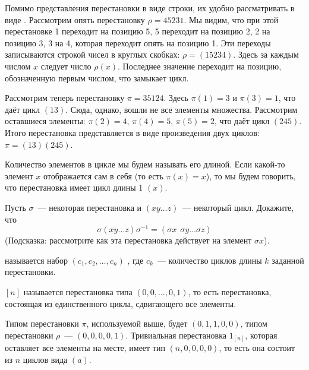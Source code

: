 Помимо представления перестановки в виде строки, их удобно рассматривать в виде . Рассмотрим опять перестановку $\rho = 45231$. Мы видим, что при этой перестановке 1 переходит на позицию 5, 5 переходит на позицию 2, 2 на позицию 3, 3 на 4, которая переходит опять на позицию 1. Эти переходы записываются строкой чисел в круглых скобках: $\rho = (15234)$. Здесь за каждым числом $x$ следует число $\rho(x)$. Последнее значение переходит на позицию, обозначенную первым числом, что замыкает цикл.

Рассмотрим теперь перестановку $\pi = 35124$. Здесь $\pi(1) = 3$ и $\pi(3) = 1$, что даёт цикл $(13)$. Сюда, однако, вошли не все элементы множества. Рассмотрим оставшиеся элементы: $\pi(2) = 4$, $\pi(4) = 5$, $\pi(5) = 2$, что даёт цикл $(245)$. Итого перестановка представляется в виде произведения двух циклов: $\pi = (13)(245)$.

Количество элементов в цикле мы будем называть его длиной. Если какой-то элемент $x$ отображается сам в себя (то есть $\pi(x) = x$), то мы будем говорить, что перестановка имеет цикл длины 1 $(x)$.

\begin{exercise}
Пусть $\sigma$~— некоторая перестановка и $(x y \ldots z)$~— некоторый цикл. Докажите, что
$$\sigma(x y \ldots z)\sigma^{-1} = (\sigma x \:\: \sigma y \ldots \sigma z)$$
(Подсказка: рассмотрите как эта перестановка действует на элемент $\sigma x$).
\end{exercise}

\begin{definition}
 называется набор $(c_1, c_2, \ldots, c_n)$ , где $c_k$~— количество циклов длины $k$ заданной перестановки.
\end{definition}

\begin{definition}
 $[n]$ называется перестановка типа $(0, 0, \ldots, 0, 1)$, то есть перестановка, состоящая из единственного цикла, сдвигающего все элементы.
\end{definition}

\begin{example}
Типом перестановки $\pi$, используемой выше, будет $(0, 1, 1, 0, 0)$, типом перестановки $\rho$~— $(0, 0, 0, 0, 1)$. Тривиальная перестановка $1_{[n]}$, которая оставляет все элементы на месте, имеет тип $(n, 0, 0, 0, 0)$, то есть она состоит из $n$ циклов вида $(a)$.
\end{example}

